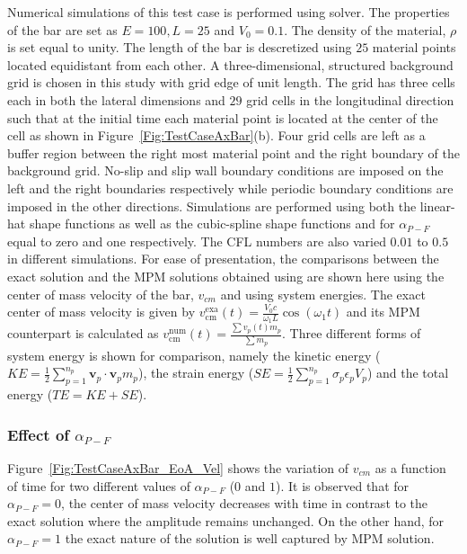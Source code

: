 Numerical simulations of this test case is performed using \Ex solver. The properties of the bar are set as $E=100, L=25$ and $V_0 = 0.1$.  The density of the material, $\rho$ is set equal to unity. The length of the bar is descretized using $25$ material points located equidistant from each other. A three-dimensional, structured background grid is chosen in this study with grid edge of unit length.  The grid has three cells each in both the lateral dimensions and $29$ grid cells in the longitudinal direction such that at the initial time each material point is located at the center of the cell as shown in Figure~\ref{Fig:TestCaseAxBar}(b). Four grid cells are left as a buffer region between the right most material point and the right boundary of the background grid. No-slip and slip wall boundary conditions are imposed on the left and the right boundaries respectively while periodic boundary conditions are imposed in the other directions. Simulations are performed using both the linear-hat shape functions as well as the cubic-spline shape functions and for $\alpha_{P-F}$ equal to zero and one respectively. The CFL numbers are also varied $0.01$ to $0.5$ in different simulations. For ease of presentation, the comparisons between the exact solution and the MPM solutions obtained using \Ex are shown here using the center of mass velocity of the bar, $v_{cm}$ and using system energies. The exact center of mass velocity is given by $v_{\mathrm{cm}}^{\mathrm{exa}}(t)=\frac{V_0 c}{\omega_1 L} \cos \left(\omega_1 t\right)$ and its MPM counterpart is calculated as $v_{\mathrm{cm}}^{\mathrm{num}}(t)=\frac{\sum v_p(t) m_p}{\sum m_p}$. Three different forms of system energy is shown for comparison, namely the kinetic energy ($KE=\frac{1}{2} \sum_{p=1}^{n_p} \mathbf{v}_p \cdot \mathbf{v}_p m_p$), the strain energy ($SE=\frac{1}{2} \sum_{p=1}^{n_p} \sigma_{p} \epsilon_{p} V_p$) and the total energy ($TE=KE+SE$).

\subsubsection{Effect of $\alpha_{P-F}$}
Figure~\ref{Fig:TestCaseAxBar_EoA_Vel} shows the variation of $v_{cm}$ as a function of time for two different values of $\alpha_{P-F}$ ($0$ and $1$). It is observed that for $\alpha_{P-F}=0$, the center of mass velocity decreases with time in contrast to the exact solution where the amplitude remains unchanged. On the other hand, for $\alpha_{P-F}=1$ the exact nature of the solution is well captured by MPM solution.

